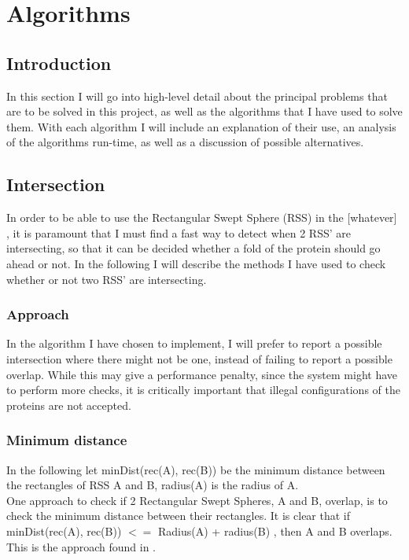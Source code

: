 
\section{Algorithms}
\label{algorithms}
\subsection{Introduction}
In this section I will go into high-level detail about the principal problems that are to be solved in this project, as well as the algorithms that I have used to solve them. With each algorithm I will include an explanation of their use, an analysis of the algorithms run-time, as well as a discussion of possible alternatives. 

\subsection{Intersection}
In order to be able to use the Rectangular Swept Sphere (RSS) in the [whatever] , it is paramount that I must find a fast way to detect when 2 RSS' are intersecting, so that it can be decided whether a fold of the protein should go ahead or not. In the following I will describe the methods I have used to check whether or not two RSS' are intersecting.

\subsubsection{Approach}
In the algorithm I have chosen to implement, I will prefer to report a possible intersection where there might not be one, instead of failing to report a possible overlap. While this may give a performance penalty, since the system might have to perform more checks, it is critically important that illegal configurations of the proteins are not accepted. 

\subsubsection{Minimum distance}
In the following let minDist(rec(A), rec(B)) be the minimum distance between the rectangles of RSS A and B, radius(A) is the radius of A.\\

One approach to check if 2 Rectangular Swept Spheres, A and B, overlap, is to check the minimum distance between their rectangles. It is clear that if minDist(rec(A), rec(B)) $<=$ Radius(A) + radius(B) , then A and B overlaps. This is the approach found in \cite{Larsen99fastproximity}.

